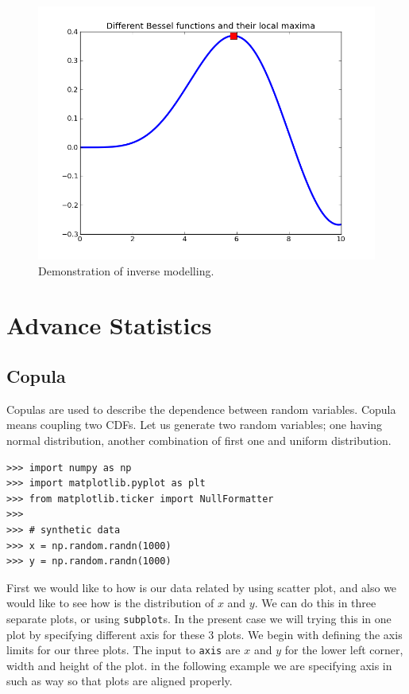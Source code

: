 \documentclass[10pt]{book}
\begin{document}
\beforefig
\begin{figure}[h!]
  \centering
    \includegraphics[scale=0.5]{images/inverse.png}
  \caption{Demonstration of inverse modelling.}
   \label{fig:inverse}
\end{figure}
\afterfig

\chapter{Advance Statistics}

\section{Copula}
Copulas are used to describe the dependence between random variables. Copula means coupling two CDFs. Let us generate two random variables; one having normal distribution, another combination of first one and uniform distribution.

\beforeverb \begin{verbatim}
>>> import numpy as np
>>> import matplotlib.pyplot as plt
>>> from matplotlib.ticker import NullFormatter
>>> 
>>> # synthetic data
>>> x = np.random.randn(1000)
>>> y = np.random.randn(1000)
\end{verbatim} \afterverb

First we would like to how is our data related by using scatter plot, and also we would like to see how is the distribution of $x$ and $y$. We can do this in three separate plots, or using \verb"subplot"s. In the present case we will trying this in one plot by specifying different axis for these 3 plots. We begin with defining the axis limits for our three plots. The input to \verb"axis" are $x$ and $y$ for the lower left corner, width and height of the plot. in the following example we are specifying axis in such as way so that plots are aligned properly. 
\end{document}
